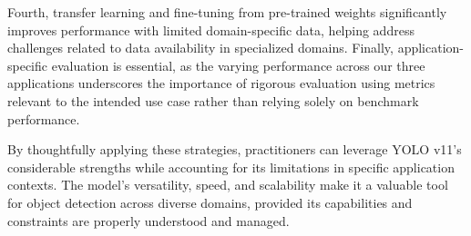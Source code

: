 \begin{multicols}{2}
Fourth, transfer learning and fine-tuning from pre-trained weights significantly improves performance with limited domain-specific data, helping address challenges related to data availability in specialized domains. Finally, application-specific evaluation is essential, as the varying performance across our three applications underscores the importance of rigorous evaluation using metrics relevant to the intended use case rather than relying solely on benchmark performance.

By thoughtfully applying these strategies, practitioners can leverage YOLO v11's considerable strengths while accounting for its limitations in specific application contexts. The model's versatility, speed, and scalability make it a valuable tool for object detection across diverse domains, provided its capabilities and constraints are properly understood and managed.
\end{multicols}
